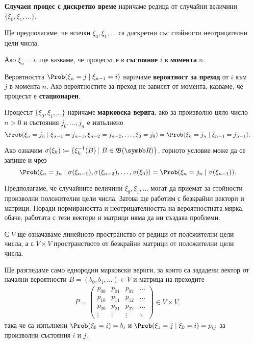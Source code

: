 \documentclass[numbers=endperiod, bibliography=totocnumbered]{scrartcl}
\begin{document}
\begin{definition}
  \textbf{Случаен процес с дискретно време} наричаме редица от случайни величини \( \{ \xi_0, \xi_1, \ldots \} \).

  Ще предполагаме, че всички \( \xi_0, \xi_1, \ldots \) са дискретни със стойности неотрицателни цели числа.

  Ако \( \xi_n = i \), ще казваме, че процесът е в \textbf{състояние} \( i \) в \textbf{момента} \( n \).

  Вероятността \( \Prob(\xi_n = j \mid \xi_{n-1} = i) \) наричаме \textbf{вероятност за преход} от \( i \) към \( j \) в момента \( n \). Ако вероятностите за преход не зависят от момента, казваме, че процесът е \textbf{стационарен}.

  Процесът \( \{ \xi_0, \xi_1, \ldots \} \) наричаме \textbf{марковска верига}, ако за произволно цяло число \( n > 0 \) и състояния \( j_0, \ldots, j_n \) е изпълнено
  \begin{equation*}
    \Prob(\xi_n = j_n \mid \xi_{n-1} = j_{n-1}, \xi_{n-2} = j_{n-2}, \ldots, \xi_0 = j_0) = \Prob(\xi_n = j_n \mid \xi_{n-1} = j_{n-1}).
  \end{equation*}

  Ако означим \( \sigma(\xi_k) \coloneqq \{ \xi_k^{-1}(B) \mid B \in \BorelAlgebra(\R) \} \), горното условие може да се запише и чрез
  \begin{equation*}
    \Prob(\xi_n = j_n \mid \SigmaAlgebra(\xi_{n-1}), \SigmaAlgebra(\xi_{n-2}), \ldots, \SigmaAlgebra(\xi_0)) = \Prob(\xi_n = j_n \mid \SigmaAlgebra(\xi_{n-1})).
  \end{equation*}
\end{definition}

\begin{remark}
  Предполагаме, че случайните величини \( \xi_0, \xi_1, \ldots \) могат да приемат за стойности произволни положителни цели числа. Затова ще работим с безкрайни вектори и матрици. Поради нормираността и неотрицателността на вероятностната мярка, обаче, работата с тези вектори и матрици няма да ни създава проблеми.
\end{remark}

С \( V \) ще означаваме линейното пространство от редици от положителни цели числа, а с \( V \times V \) пространството от безкрайни матрици от положителни цели числа.

Ще разгледаме само еднородни марковски вериги, за които са зададени вектор от начални вероятности \( B = (b_0, b_1, \ldots) \in V \) и матрица на преходите
\begin{align*}
  P = \begin{pmatrix}
    p_{00} & p_{01} & p_{02} & \ldots \\
    p_{10} & p_{11} & p_{12} & \ldots \\
    p_{20} & p_{21} & p_{22} & \ldots \\
    \vdots & \vdots & \vdots & \ddots
  \end{pmatrix} \in V \times V,
\end{align*}
така че са изпълнени \( \Prob(\xi_0 = i) = b_i \) и \( \Prob(\xi_1 = j \mid \xi_0 = i) = p_{ij} \) за произволни състояния \( i \) и \( j \).
\end{document}

